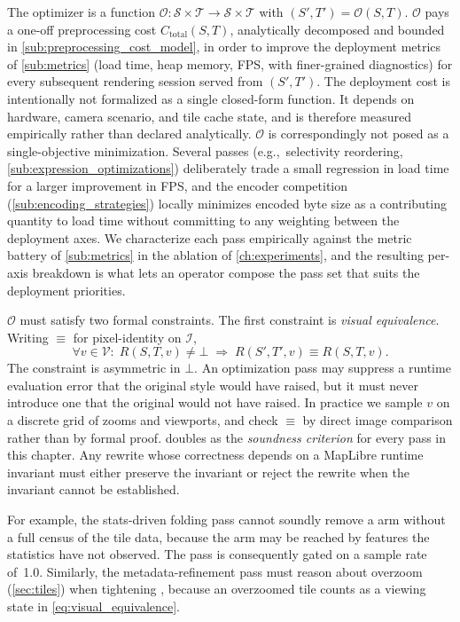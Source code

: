 The optimizer is a function $\mathcal{O}: \mathcal{S} \times \mathcal{T} \to \mathcal{S} \times \mathcal{T}$ with $(S', T') = \mathcal{O}(S, T)$.
$\mathcal{O}$ pays a one-off preprocessing cost $C_\text{total}(S, T)$, analytically decomposed and bounded in \cref{sub:preprocessing_cost_model}, in order to improve the deployment metrics of \cref{sub:metrics} (load time, heap memory, FPS, with finer-grained diagnostics) for every subsequent rendering session served from $(S', T')$.
The deployment cost is intentionally not formalized as a single closed-form function.
It depends on hardware, camera scenario, and tile cache state, and is therefore measured empirically rather than declared analytically.
$\mathcal{O}$ is correspondingly not posed as a single-objective minimization.
Several passes (e.g.,\ selectivity reordering, \cref{sub:expression_optimizations}) deliberately trade a small regression in load time for a larger improvement in FPS, and the encoder competition (\cref{sub:encoding_strategies}) locally minimizes encoded byte size as a contributing quantity to load time without committing to any weighting between the deployment axes.
We characterize each pass empirically against the metric battery of \cref{sub:metrics} in the ablation of \cref{ch:experiments}, and the resulting per-axis breakdown is what lets an operator compose the pass set that suits the deployment priorities.

$\mathcal{O}$ must satisfy two formal constraints.
The first constraint is \emph{visual equivalence}.
Writing $\equiv$ for pixel-identity on $\mathcal{I}$,
\begin{equation}\label{eq:visual_equivalence}
    \forall v \in \mathcal{V}:\; R(S, T, v) \neq \bot \;\Rightarrow\; R(S', T', v) \equiv R(S, T, v).
\end{equation}
The constraint is asymmetric in $\bot$.
An optimization pass may suppress a runtime evaluation error that the original style would have raised, but it must never introduce one that the original would not have raised.
In practice we sample $v$ on a discrete grid of zooms and viewports, and check $\equiv$ by direct image comparison rather than by formal proof.
 doubles as the \emph{soundness criterion} for every pass in this chapter.
Any rewrite whose correctness depends on a MapLibre runtime invariant must either preserve the invariant or reject the rewrite when the invariant cannot be established.

For example, the stats-driven folding pass cannot soundly remove a  arm without a full census of the tile data, because the arm may be reached by features the statistics have not observed.
The pass is consequently gated on a sample rate of~1.0.
Similarly, the metadata-refinement pass must reason about overzoom (\cref{sec:tiles}) when tightening , because an overzoomed tile counts as a viewing state in \cref{eq:visual_equivalence}.

